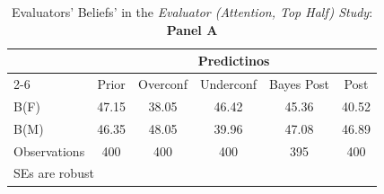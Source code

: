 \begin{table}[htbp]\centering
\caption{Evaluators' Beliefs' in the \textit{Evaluator (Attention, Top Half) Study}: \textbf{Panel A}}
\begin{tabular}{l*{5}{c}}
\hline\hline
                &\multicolumn{5}{c}{Predictinos}                  \\\cmidrule(lr){2-6}
                &\multicolumn{1}{c}{Prior}&\multicolumn{1}{c}{Overconf}&\multicolumn{1}{c}{Underconf}&\multicolumn{1}{c}{Bayes Post}&\multicolumn{1}{c}{Post}\\
\hline
B(F)            &    47.15&    38.05&    46.42&    45.36&    40.52\\
B(M)            &    46.35&    48.05&    39.96&    47.08&    46.89\\
\hline
Observations    &      400&      400&      400&      395&      400\\
\hline\hline
\multicolumn{6}{l}{\footnotesize SEs are robust}\\
\end{tabular}
\end{table}
